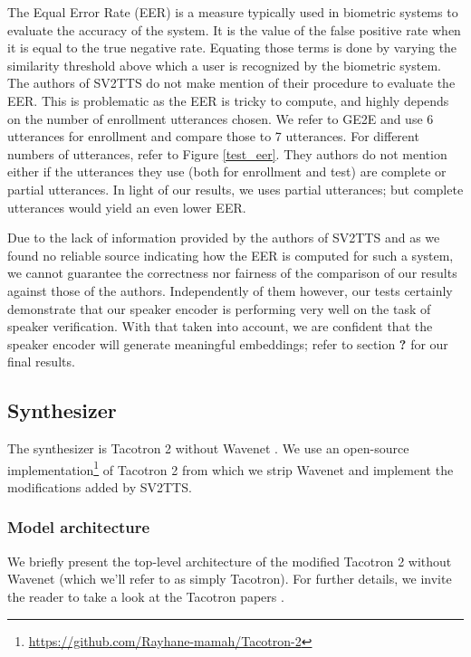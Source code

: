 \documentclass[a4paper, oneside, 12pt, english]{article}
\newcommand{\rw}{\color{red}\textbf{?} \color{black}}		%
\begin{document}
The Equal Error Rate (EER) is a measure typically used in biometric systems to evaluate the accuracy of the system. It is the value of the false positive rate when it is equal to the true negative rate. Equating those terms is done by varying the similarity threshold above which a user is recognized by the biometric system. The authors of SV2TTS do not make mention of their procedure to evaluate the EER. This is problematic as the EER is tricky to compute, and highly depends on the number of enrollment utterances chosen. We refer to GE2E and use 6 utterances for enrollment and compare those to 7 utterances. For different numbers of utterances, refer to Figure \ref{test_eer}. They authors do not mention either if the utterances they use (both for enrollment and test) are complete or partial utterances. In light of our results, we uses partial utterances; but complete utterances would yield an even lower EER.

Due to the lack of information provided by the authors of SV2TTS and as we found no reliable source indicating how the EER is computed for such a system, we cannot guarantee the correctness nor fairness of the comparison of our results against those of the authors. Independently of them however, our tests certainly demonstrate that our speaker encoder is performing very well on the task of speaker verification. With that taken into account, we are confident that the speaker encoder will generate meaningful embeddings; refer to section \rw for our final results.


\subsection{Synthesizer} \label{synthesizer}
The synthesizer is Tacotron 2 without Wavenet \citep{WaveNet}. We use an open-source implementation\footnote{\url{https://github.com/Rayhane-mamah/Tacotron-2}} of Tacotron 2 from which we strip Wavenet and implement the modifications added by SV2TTS.

\subsubsection{Model architecture}
We briefly present the top-level architecture of the modified Tacotron 2 without Wavenet (which we'll refer to as simply Tacotron). For further details, we invite the reader to take a look at the Tacotron papers \citep{Tacotron2, Tacotron1}.
\end{document}
